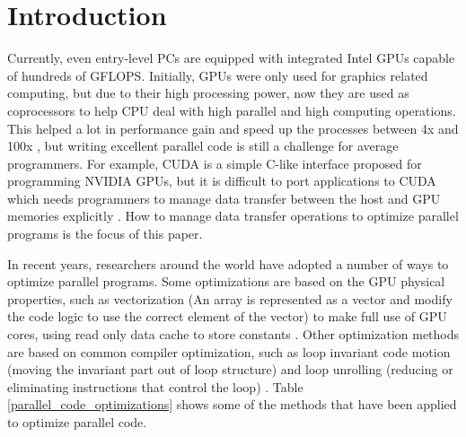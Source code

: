\documentclass[10pt,conference]{IEEEtran}
\begin{document}
%
\IEEEpeerreviewmaketitle



\section{Introduction}
Currently, even entry-level PCs are equipped with integrated Intel GPUs capable of hundreds of GFLOPS. Initially, GPUs were only used for graphics related computing, but due to their high processing power, now they are used as coprocessors to help CPU deal with high parallel and high computing operations. This helped a lot in performance gain and speed up the processes between 4x and 100x \cite{IEEEhowto:1}\cite{IEEEhowto:2}\cite{IEEEhowto:3}, but writing excellent parallel code is still a challenge for average programmers. For example, CUDA is a simple C-like interface proposed for programming NVIDIA GPUs, but it is difficult to port applications to CUDA which needs programmers to manage data transfer between the host and GPU memories explicitly \cite{IEEEhowto:4}. How to manage data transfer operations to optimize parallel programs is the focus of this paper.

In recent years, researchers around the world have adopted a number of ways to optimize parallel programs. Some optimizations are based on the GPU physical properties, such as vectorization (An array is represented as a vector and modify the code logic to use the correct element of the vector) \cite{IEEEhowto:5} to make full use of GPU cores, using read only data cache to store constants \cite{IEEEhowto:3}. Other optimization methods are based on common compiler optimization, such as loop invariant code motion (moving the invariant part out of loop structure) \cite{IEEEhowto:6}\cite{IEEEhowto:7} and loop unrolling (reducing or eliminating instructions that control the loop) \cite{IEEEhowto:8}. Table \ref{parallel_code_optimizations} shows some of the methods that have been applied to optimize parallel code.
\end{document}
